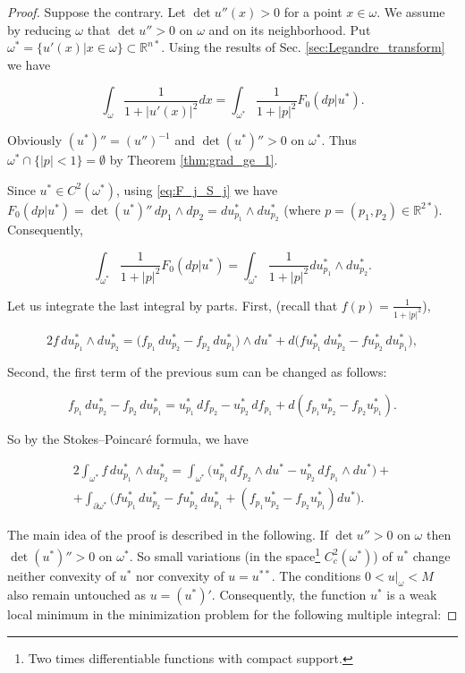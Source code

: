 \documentclass[14pt]{extarticle}
\newcommand{\R}{\mathbb{R}}
\theoremstyle{remark}
\theoremstyle{definition}
\begin{document}
\begin{proof} 

Suppose the contrary. Let $\det u''(x)>0$ for a point $x\in\omega$. We assume by reducing $\omega$ that $\det u'' > 0$ on $\omega$ and on its neighborhood. Put $\omega^*=\{u'(x)|x\in\omega\}\subset \R^{n*}$. Using the results of Sec. \ref{sec:Legandre_transform} we have

\[
	\int_\omega \frac{1}{1+|u'(x)|^2}dx = \int_{\omega^*}\frac{1}{1+|p|^2} F_0(dp|u^*).
\]

Obviously $(u^*)'' = (u'')^{-1}$ and $\det (u^*)''>0$ on $\omega^*$. Thus $\omega^*\cap\{|p|<1\}=\emptyset$ by Theorem \ref{thm:grad_ge_1}.

Since $u^*\in C^2(\omega^*)$, using \eqref{eq:F_j_S_j} we have $F_0(dp|u^*)=\det (u^*)''\,dp_1\wedge dp_2=du^*_{p_1}\wedge du^*_{p_2}$ (where $p=(p_1,p_2)\in\R^{2*}$). Consequently,

\[
	\int_{\omega^*}\frac{1}{1+|p|^2} F_0(dp|u^*) = \int_{\omega^*}\frac{1}{1+|p|^2} du^*_{p_1}\wedge du^*_{p_2}.
\]

Let us integrate the last integral by parts. First, (recall that $f(p)=\frac{1}{1+|p|^2}$),

\[
	2f\,du^*_{p_1}\wedge du^*_{p_2} = \big( 
		f_{p_1}\, du^*_{p_2} - f_{p_2}\, du^*_{p_1}
	\big)\wedge du^* + 
	d\big(fu^*_{p_1}\,du^*_{p_2} - fu^*_{p_2}\,du^*_{p_1} \big),
\]

\noindent Second, the first term of the previous sum can be changed as follows:

\[
	f_{p_1}\, du^*_{p_2} - f_{p_2}\, du^*_{p_1} = 
	u^*_{p_1}\,df_{p_2} - u^*_{p_2}\,df_{p_1} + d(f_{p_1}u^*_{p_2}-f_{p_2}u^*_{p_1}).
\]

\noindent So by the Stokes--Poincar\'e formula, we have

\begin{multline*}
	2\int_{\omega^*} f\,du^*_{p_1}\wedge du^*_{p_2} = 
	\int_{\omega^*} \big(
		u^*_{p_1}\,df_{p_2}\wedge du^* - u^*_{p_2}\,df_{p_1}\wedge du^*
	\big) +\\
	+\int_{\partial\omega^*} \big(
		fu^*_{p_1}\,du^*_{p_2} - fu^*_{p_2}\,du^*_{p_1} + (f_{p_1}u^*_{p_2}-f_{p_2}u^*_{p_1}) du^*
	\big).
\end{multline*}

The main idea of the proof is described in the following. If $\det u''>0$ on $\omega$ then $\det (u^*)'' > 0$ on $\omega^*$. So small variations (in the space\footnote{Two times differentiable functions with compact support.} $C^2_c(\omega^*)$) of $u^*$ change neither convexity of $u^*$ nor convexity of $u=u^{**}$. The conditions $0<u|_{\omega}<M$ also remain untouched as $u=(u^*)'$. Consequently, the function $u^*$ is a weak local minimum in the minimization problem for the following multiple integral:


\end{proof}
\end{document}
